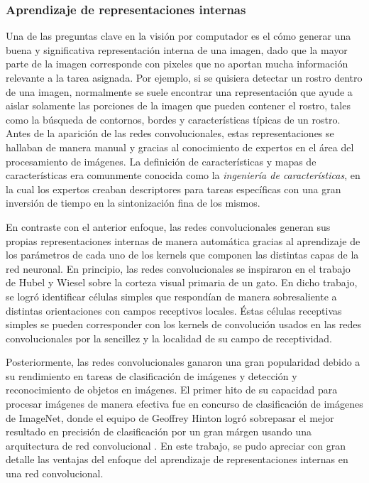         \subsubsection{Aprendizaje de representaciones internas}
        Una de las preguntas clave en la visión por computador es el cómo generar una buena y significativa
        representación interna de una imagen, dado que la mayor parte de la imagen corresponde con pixeles que no 
        aportan mucha información relevante a la tarea asignada. Por ejemplo, si se quisiera detectar 
        un rostro dentro de una imagen, normalmente se suele encontrar una representación que ayude a aislar solamente 
        las porciones de la imagen que pueden contener el rostro, tales como la búsqueda de contornos, bordes y 
        características típicas de un rostro. Antes de la aparición de las redes convolucionales, estas representaciones 
        se hallaban de manera manual y gracias al conocimiento de expertos en el área del procesamiento de imágenes. 
        La definición de características y mapas de características era comunmente conocida como la 
        \textit{ingeniería de características}, en la cual los expertos creaban descriptores para tareas específicas con 
        una gran inversión de tiempo en la sintonización fina de los mismos. 


        En contraste con el anterior enfoque, las redes convolucionales generan sus propias representaciones internas
        de manera automática gracias al aprendizaje de los parámetros de cada uno de los kernels que componen las distintas 
        capas de la red neuronal. En principio, las redes convolucionales se inspiraron en el trabajo de Hubel y Wiesel 
        sobre la corteza visual primaria de un gato\cite{lecun2010convolutional}. En dicho trabajo, se logró identificar células simples que respondían
        de manera sobresaliente a distintas orientaciones con campos receptivos locales. Éstas células receptivas simples 
        se pueden corresponder con los kernels de convolución usados en las redes convolucionales por la sencillez y la 
        localidad de su campo de receptividad.

        Posteriormente, las redes convolucionales ganaron una gran popularidad debido a su rendimiento en tareas de 
        clasificación de imágenes y detección y reconocimiento de objetos en imágenes. El primer hito de su capacidad 
        para procesar imágenes de manera efectiva fue en concurso de clasificación de imágenes de ImageNet, donde 
        el equipo de Geoffrey Hinton logró sobrepasar el mejor resultado en precisión de clasificación por un gran márgen 
        usando una arquitectura de red convolucional \cite{krizhevsky2012imagenet}. En este trabajo, se pudo apreciar con 
        gran detalle las ventajas del enfoque del aprendizaje de representaciones internas en una red convolucional.

